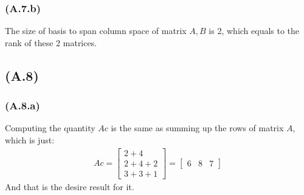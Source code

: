 \documentclass[]{article}
\begin{document}
        \subsubsection*{(A.7.b)}
            The size of basis to span column space of matrix $A,B$ is 2, which equals to the rank of these 2 matrices. 
    \subsection*{(A.8)}
        \subsubsection*{(A.8.a)}
            Computing the quantity $Ac$ is the same as summing up the rows of matrix $A$, which is just: 
            \begin{align*}\tag{2.8.a.1}\label{eqn:2.8.a.1}
                Ac = \begin{bmatrix}
                    2 + 4 \\ 2 + 4 + 2 \\ 3 + 3 + 1 
                \end{bmatrix}
                =
                \begin{bmatrix}
                    6 & 8 & 7
                \end{bmatrix}
            \end{align*}
            And that is the desire result for it. 
\end{document}
